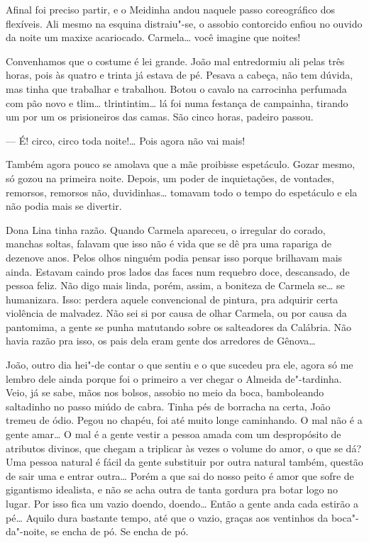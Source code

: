 \begin{linenumbers}
Afinal foi preciso partir, e o Meidinha andou naquele passo coreográfico
dos flexíveis. Ali mesmo na esquina distraiu"-se, o assobio contorcido
enfiou no ouvido da noite um maxixe acariocado. Carmela\ldots{} você imagine
que noites!

Convenhamos que o costume é lei grande. João mal entredormiu ali pelas
três horas, pois às quatro e trinta já estava de pé. Pesava a cabeça,
não tem dúvida, mas tinha que trabalhar e trabalhou. Botou o cavalo na
carrocinha perfumada com pão novo e tlim\ldots{} tlrintintim\ldots{} lá foi numa
festança de campainha, tirando um por um os prisioneiros das camas. São
cinco horas, padeiro passou.

--- É! circo, circo toda noite!\ldots{} Pois agora não vai mais!

Também agora pouco se amolava que a mãe proibisse espetáculo. Gozar
mesmo, só gozou na primeira noite. Depois, um poder de inquietações, de
vontades, remorsos, remorsos não, duvidinhas\ldots{} tomavam todo o tempo do
espetáculo e ela não podia mais se divertir.

Dona Lina tinha razão. Quando Carmela apareceu, o irregular do corado,
manchas soltas, falavam que isso não é vida que se dê pra uma rapariga
de dezenove anos. Pelos olhos ninguém podia pensar isso porque brilhavam
mais ainda. Estavam caindo pros lados das faces num requebro doce,
descansado, de pessoa feliz. Não digo mais linda, porém, assim, a
boniteza de Carmela se\ldots{} se humanizara. Isso: perdera aquele
convencional de pintura, pra adquirir certa violência de malvadez. Não
sei si por causa de olhar Carmela, ou por causa da pantomima, a gente se
punha matutando sobre os salteadores da Calábria. Não havia razão pra
isso, os pais dela eram gente dos arredores de Gênova\ldots{}

João, outro dia hei"-de contar o que sentiu e o que sucedeu pra ele,
agora só me lembro dele ainda porque foi o primeiro a ver chegar o
Almeida de"-tardinha. Veio, já se sabe, mãos nos bolsos, assobio no meio
da boca, bamboleando saltadinho no passo miúdo de cabra. Tinha pés de
borracha na certa, João tremeu de ódio. Pegou no chapéu, foi até muito
longe caminhando. O mal não é a gente amar\ldots{} O mal é a gente vestir a
pessoa amada com um despropósito de atributos divinos, que chegam a
triplicar às vezes o volume do amor, o que se dá? Uma pessoa natural é
fácil da gente substituir por outra natural também, questão de sair uma
e entrar outra\ldots{} Porém a que sai do nosso peito é amor que sofre de
gigantismo idealista, e não se acha outra de tanta gordura pra botar
logo no lugar. Por isso fica um vazio doendo, doendo\ldots{} Então a gente
anda cada estirão a pé\ldots{} Aquilo dura bastante tempo, até que o vazio,
graças aos ventinhos da boca"-da"-noite, se encha de pó. Se encha de pó.


\end{linenumbers}
